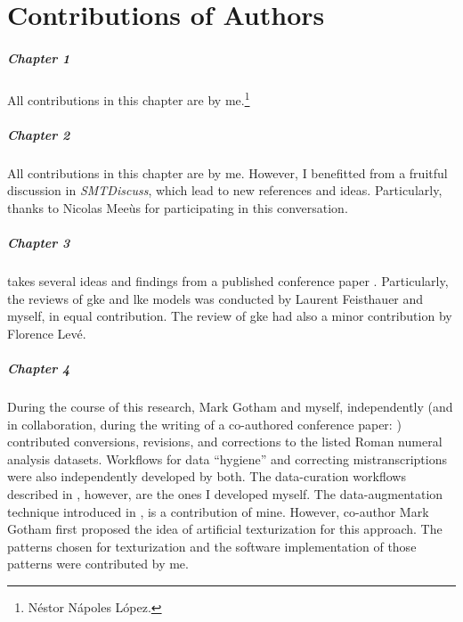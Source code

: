\chapter*{Contributions of Authors}
\label{chap:contributionsofauthors}

\paragraph{Chapter 1}
All contributions in this chapter are by
me.\footnote{N\'estor N\'apoles L\'opez.}

\paragraph{Chapter 2}
All contributions in this chapter are by me. However, I
benefitted from a fruitful discussion in
\emph{SMTDiscuss},
which lead to new references and ideas. Particularly, thanks
to Nicolas Mee\`us for participating in this conversation.

\paragraph{Chapter 3} 
 takes several ideas and findings
from a published conference paper
\parencite{napoleslopez2020local}. Particularly, the reviews
of \gls{gke} and \gls{lke} models was conducted by Laurent
Feisthauer and myself, in equal contribution. The review of
\gls{gke} had also a minor contribution by Florence Lev\'e.

\paragraph{Chapter 4} 
During the course of this research, Mark Gotham and myself,
independently (and in collaboration, during the writing of a
co-authored conference paper:
\cite{napoleslopez2021augmentednet}) contributed
conversions, revisions, and corrections to the listed Roman
numeral analysis datasets. Workflows for data ``hygiene''
and correcting mistranscriptions were also independently
developed by both. The data-curation workflows described in
, however, are the ones
I developed myself. The data-augmentation technique
introduced in
, is a
contribution of mine. However, co-author Mark Gotham first
proposed the idea of artificial texturization for this
approach. The patterns chosen for texturization and the
software implementation of those patterns were contributed
by me.

